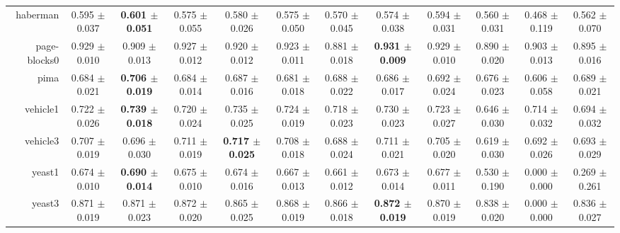 \begin{table}[!ht]
{\begin{tabular}{r c c c c c c c c c c c}
haberman & 0.595 $\pm$ 0.037 & \textbf{0.601 $\pm$ 0.051} & 0.575 $\pm$ 0.055 & 0.580 $\pm$ 0.026 & 0.575 $\pm$ 0.050 & 0.570 $\pm$ 0.045 & 0.574 $\pm$ 0.038 & 0.594 $\pm$ 0.031 & 0.560 $\pm$ 0.031 & 0.468 $\pm$ 0.119 & 0.562 $\pm$ 0.070 \\
page-blocks0 & 0.929 $\pm$ 0.010 & 0.909 $\pm$ 0.013 & 0.927 $\pm$ 0.012 & 0.920 $\pm$ 0.012 & 0.923 $\pm$ 0.011 & 0.881 $\pm$ 0.018 & \textbf{0.931 $\pm$ 0.009} & 0.929 $\pm$ 0.010 & 0.890 $\pm$ 0.020 & 0.903 $\pm$ 0.013 & 0.895 $\pm$ 0.016 \\
pima & 0.684 $\pm$ 0.021 & \textbf{0.706 $\pm$ 0.019} & 0.684 $\pm$ 0.014 & 0.687 $\pm$ 0.016 & 0.681 $\pm$ 0.018 & 0.688 $\pm$ 0.022 & 0.686 $\pm$ 0.017 & 0.692 $\pm$ 0.024 & 0.676 $\pm$ 0.023 & 0.606 $\pm$ 0.058 & 0.689 $\pm$ 0.021 \\
vehicle1 & 0.722 $\pm$ 0.026 & \textbf{0.739 $\pm$ 0.018} & 0.720 $\pm$ 0.024 & 0.735 $\pm$ 0.025 & 0.724 $\pm$ 0.019 & 0.718 $\pm$ 0.023 & 0.730 $\pm$ 0.023 & 0.723 $\pm$ 0.027 & 0.646 $\pm$ 0.030 & 0.714 $\pm$ 0.032 & 0.694 $\pm$ 0.032 \\
vehicle3 & 0.707 $\pm$ 0.019 & 0.696 $\pm$ 0.030 & 0.711 $\pm$ 0.019 & \textbf{0.717 $\pm$ 0.025} & 0.708 $\pm$ 0.018 & 0.688 $\pm$ 0.024 & 0.711 $\pm$ 0.021 & 0.705 $\pm$ 0.020 & 0.619 $\pm$ 0.030 & 0.692 $\pm$ 0.026 & 0.693 $\pm$ 0.029 \\
yeast1 & 0.674 $\pm$ 0.010 & \textbf{0.690 $\pm$ 0.014} & 0.675 $\pm$ 0.010 & 0.674 $\pm$ 0.016 & 0.667 $\pm$ 0.013 & 0.661 $\pm$ 0.012 & 0.673 $\pm$ 0.014 & 0.677 $\pm$ 0.011 & 0.530 $\pm$ 0.190 & 0.000 $\pm$ 0.000 & 0.269 $\pm$ 0.261 \\
yeast3 & 0.871 $\pm$ 0.019 & 0.871 $\pm$ 0.023 & 0.872 $\pm$ 0.020 & 0.865 $\pm$ 0.025 & 0.868 $\pm$ 0.019 & 0.866 $\pm$ 0.018 & \textbf{0.872 $\pm$ 0.019} & 0.870 $\pm$ 0.019 & 0.838 $\pm$ 0.020 & 0.000 $\pm$ 0.000 & 0.836 $\pm$ 0.027 \\
\end{tabular}}
\end{table}
